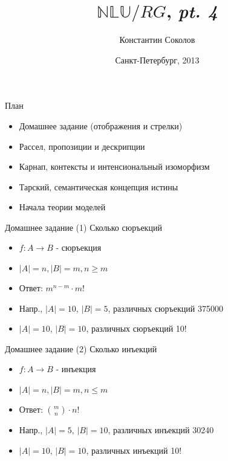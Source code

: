 \documentclass{beamer}
\begin{document}
\title{\huge{$\mathbb{NLU}/RG$, \textit{pt. 4}}}
\author{Константин Соколов}
\date{Санкт-Петербург, 2013} 
\begin{frame}
    \thispagestyle{empty}
    \titlepage
\end{frame}

\begin{frame}{План}
    \setcounter{framenumber}{1}
    \begin{itemize}
        \item Домашнее задание (отображения и стрелки)
        \item Рассел, пропозиции и дескрипции
        \item Карнап, контексты и интенсиональный изоморфизм
        \item Тарский, семантическая концепция истины
        \item Начала теории моделей
    \end{itemize}
\end{frame}

\begin{frame}{Домашнее задание (1)}
Сколько сюръекций\\
\bigskip
  \begin{itemize}
    \item $f : A \to B$ - сюръекция
    \item $\left\vert{A}\right\vert = n, \left\vert{B}\right\vert = m, n \geq m$
    \item Ответ: $m^{n-m} \cdot m!$
    \item Напр., $\left\vert{A}\right\vert = 10$, $\left\vert{B}\right\vert = 5$, различных сюръекций 375000
    \item $\left\vert{A}\right\vert = 10$, $\left\vert{B}\right\vert = 10$, различных сюръекций 10!
  \end{itemize}  
\end{frame}

\begin{frame}{Домашнее задание (2)}
Сколько инъекций\\
\bigskip
  \begin{itemize}
    \item $f : A \to B$ - инъекция
    \item $\left\vert{A}\right\vert = n, \left\vert{B}\right\vert = m, n \leq m$
    \item Ответ: ${m \choose n} \cdot n!$
    \item Напр., $\left\vert{A}\right\vert = 5$, $\left\vert{B}\right\vert = 10$, различных инъекций 30240 
    \item $\left\vert{A}\right\vert = 10$, $\left\vert{B}\right\vert = 10$, различных инъекций 10! 
  \end{itemize}  
\end{frame}
\end{document}
